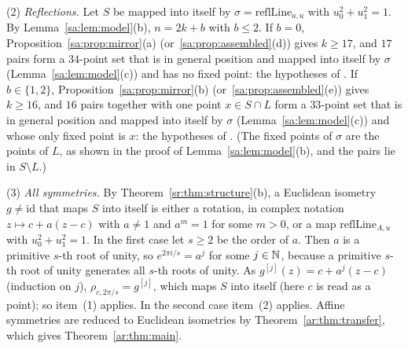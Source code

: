 \begin{remark}
(2) \emph{Reflections.} Let $S$ be mapped into itself by $\sigma=\mathrm{reflLine}_{a,u}$ with $u_0^2+u_1^2=1$. By
Lemma~\ref{sa:lem:model}(b), $n=2k+b$ with $b\le2$. If $b=0$, Proposition~\ref{sa:prop:mirror}(a)
(or~\ref{sa:prop:assembled}(d)) gives $k\ge17$, and $17$ pairs form a $34$-point set that is in general position and
mapped into itself by $\sigma$ (Lemma~\ref{sa:lem:model}(c)) and has no fixed point: the hypotheses of
. If $b\in\{1,2\}$, Proposition~\ref{sa:prop:mirror}(b) (or~\ref{sa:prop:assembled}(e)) gives
$k\ge16$, and $16$ pairs together with one point $x\in S\cap L$ form a $33$-point set that is in general position and
mapped into itself by $\sigma$ (Lemma~\ref{sa:lem:model}(c)) and whose only fixed point is $x$: the hypotheses of
. (The fixed points of $\sigma$ are the points of $L$, as shown in the proof of
Lemma~\ref{sa:lem:model}(b), and the pairs lie in $S\setminus L$.)

(3) \emph{All symmetries.} By Theorem~\ref{sr:thm:structure}(b), a Euclidean isometry $g\ne\mathrm{id}$ that maps $S$
into itself is either a rotation, in complex notation $z\mapsto c+a(z-c)$ with $a\ne1$ and $a^m=1$ for some $m>0$, or
a map $\mathrm{reflLine}_{A,u}$ with $u_0^2+u_1^2=1$. In the first case let $s\ge2$ be the order of $a$. Then $a$ is a
primitive $s$-th root of unity, so $e^{2\pi i/s}=a^j$ for some $j\in\mathbb N$, because a primitive $s$-th root of unity
generates all $s$-th roots of unity. As $g^{[j]}(z)=c+a^j(z-c)$ (induction on $j$), $\rho_{c,2\pi/s}=g^{[j]}$, which
maps $S$ into itself (here $c$ is read as a point); so item~(1) applies. In the second case item~(2) applies.
Affine symmetries are reduced to Euclidean isometries by Theorem~\ref{ar:thm:transfer}, which gives
Theorem~\ref{ar:thm:main}.


\end{remark}
